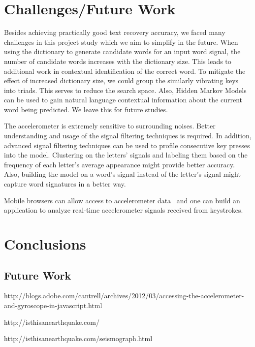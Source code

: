 \documentclass[11pt,conference]{IEEEtran}
\begin{document}
\section{Challenges/Future Work}
\noindent Besides achieving practically good text recovery accuracy, we faced many challenges in
this project study which we aim to simplify in the future. When using the dictionary to generate
candidate words for an input word signal, the number of candidate words increases with the dictionary
size. This leads to additional work in contextual identification of the correct word. To mitigate the
effect of increased dictionary size, we could group the similarly vibrating keys into triads. This serves
to reduce the search space. Also, Hidden Markov Models can be used to gain natural language contextual
information about the current word being predicted. We leave this for future studies.

The accelerometer is extremely sensitive to surrounding noises. Better understanding and usage of the signal
filtering techniques is required. In addition, advanced signal filtering techniques can be used to
profile consecutive key presses into the model. Clustering on the letters' signals and labeling them based on the frequency of
each letter's average appearance might provide better accuracy. Also, building the model on a word's signal
instead of the letter's signal might capture word signatures in a better way.

Mobile browsers can allow access
to accelerometer data~\cite{acc-web-browsers} and one can
build an application to analyze real-time accelerometer signals received from keystrokes.

\section{Conclusions}
\label{sec:conclusion}

\subsection{Future Work}


http://blogs.adobe.com/cantrell/archives/2012/03/accessing-the-accelerometer-and-gyroscope-in-javascript.html

http://isthisanearthquake.com/

http://isthisanearthquake.com/seismograph.html


\pagebreak
\end{document}
